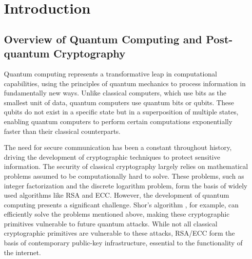 \documentclass[cryptography,review,submit,pdftex,moreauthors,amsmath,amssymb,aps,strict]{Definitions/mdpi}
\begin{document}
\section{Introduction} \label{introduction}

\subsection{Overview of Quantum Computing and Post-quantum Cryptography}

Quantum computing represents a transformative leap in computational capabilities, using the principles of quantum mechanics to process information in fundamentally new ways. Unlike classical computers, which use bits as the smallest unit of data, quantum computers use quantum bits or qubits. These qubits do not exist in a specific state but in a superposition of multiple states, enabling quantum computers to perform certain computations exponentially faster than their classical counterparts. 

The need for secure communication has been a constant throughout history, driving the development of cryptographic techniques to protect sensitive information. The security of classical cryptography largely relies on mathematical problems assumed to be computationally hard to solve. These problems, such as integer factorization and the discrete logarithm problem, form the basis of widely used algorithms like RSA and ECC. However, the development of quantum computing presents a significant challenge. Shor's algorithm \cite{Shor94}, for example, can efficiently solve the problems mentioned above, making these cryptographic primitives vulnerable to future quantum attacks. While not all classical cryptographic primitives are vulnerable to these attacks, RSA/ECC form the basis of contemporary public-key infrastructure, essential to the functionality of the internet.
\end{document}
